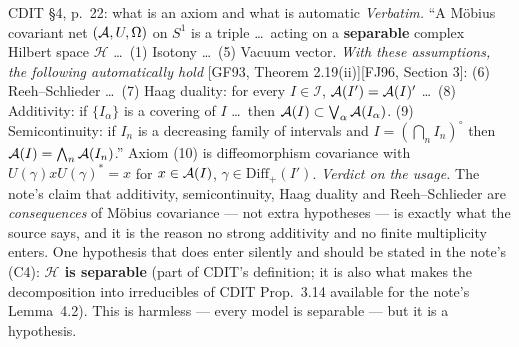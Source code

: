 \documentclass[11pt]{article}
\newcommand{\Om}{\Omega}
\newcommand{\Hil}{\mathcal H}
\newcommand{\Diff}{\mathrm{Diff}_+}
\begin{document}
\begin{citedbox}{CDIT \S4, p.~22: what is an axiom and what is automatic}
\emph{Verbatim.}  ``A M\"obius covariant net $(\cA,U,\Om)$ on $S^1$ is a triple \dots\ acting on a
\textbf{separable} complex Hilbert space $\Hil$ \dots\ (1) Isotony \dots\ (5) Vacuum vector.  \emph{With these
assumptions, the following automatically hold} [GF93, Theorem 2.19(ii)][FJ96, Section 3]: (6) Reeh--Schlieder
\dots\ (7) Haag duality: for every $I\in\mathcal I$, $\mathcal A(I')=\mathcal A(I)'$ \dots\ (8) Additivity: if
$\{I_\alpha\}$ is a covering of $I$ \dots\ then $\mathcal A(I)\subset\bigvee_\alpha\mathcal A(I_\alpha)$. (9)
Semicontinuity: if $I_n$ is a decreasing family of intervals and $I=(\bigcap_nI_n)^\circ$ then
$\mathcal A(I)=\bigwedge_n\mathcal A(I_n)$.''  Axiom (10) is diffeomorphism covariance with
$U(\gamma)x U(\gamma)^*=x$ for $x\in\mathcal A(I)$, $\gamma\in\Diff(I')$.
\emph{Verdict on the usage.}  The note's claim that additivity, semicontinuity, Haag duality and
Reeh--Schlieder are \emph{consequences} of M\"obius covariance --- not extra hypotheses --- is exactly what the
source says, and it is the reason no strong additivity and no finite multiplicity enters.  One hypothesis that
does enter silently and should be stated in the note's (C4): \textbf{$\Hil$ is separable} (part of CDIT's
definition; it is also what makes the decomposition into irreducibles of CDIT Prop.~3.14 available for the
note's Lemma~4.2).  This is harmless --- every model is separable --- but it is a hypothesis.
\end{citedbox}
\end{document}
